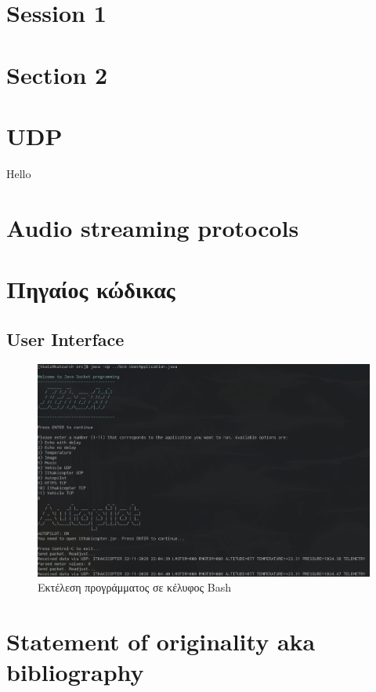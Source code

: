 \documentclass[hidelinks, 12pt, a4paper]{article}
\begin{document}
\section{Session 1}

\section{Section 2}

\section{UDP}
Hello

\section{Audio streaming protocols}

\section{Πηγαίος κώδικας}

\subsection{User Interface}

\begin{figure}[h!]
\centering
	\includegraphics[width=\textwidth]{assets/ui.png}
	\caption{Εκτέλεση προγράμματος σε κέλυφος Bash} 
    \label{fig:ui}
\end{figure}



\section{Statement of originality aka bibliography}
 
\end{document}
